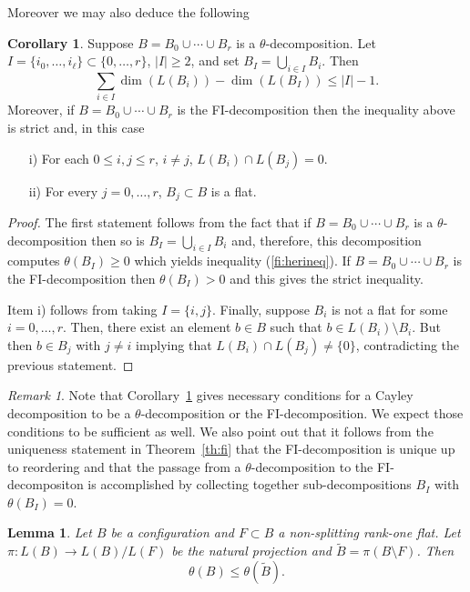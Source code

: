 \documentclass[11pt]{amsart}
\theoremstyle{plain}
\newtheorem{lemma}[theorem]{Lemma}
\theoremstyle{definition}
\newtheorem{corollary}[theorem]{Corollary}
\newcounter{remarks}
\theoremstyle{remark}
\newtheorem{remark}[remarks]{Remark}
\newcommand{\beq}{\begin{equation}}
\newcommand{\eeq}{\end{equation}}
\newcommand{\fs}{\mathfrak s}
\numberwithin{equation}{section}
\begin{document}
Moreover we may also deduce the following

\begin{corollary}\label{fi:cor3} 
Suppose $B = B_0 \cup \cdots \cup B_r$ is a $\theta$-decomposition.  Let 
$I = \{i_0,\dots,i_\ell\}  \subset \{0,\dots,r\}$, $|I| \geq 2$, and set
$B_I = \bigcup_{i\in I} B_i$.  Then
\beq\label{fi:herineq}
\sum_{i\in I} \dim(L(B_i)) - \dim(L(B_I)) \leq |I| - 1.
\eeq
Moreover, if $B = B_0 \cup \cdots \cup B_r$ is the FI-decomposition then the inequality above is strict and, in this case
\begin{enumerate}
\item[i)] For each $0\leq i,j \leq r$, $i\not= j$, $L(B_i) \cap L(B_j)=0$.
\item[ii)] For every $j=0,\dots,r$, $B_j \subset B$ is a flat.
\end{enumerate}
\end{corollary}

\begin{proof} 
The first statement follows from the fact that if $B = B_0 \cup \cdots \cup B_r$ is a $\theta$-decomposition then so is $B_I = \bigcup_{i\in I} B_i$ and, therefore, 
this decomposition computes $\theta(B_I) \geq 0$ which yields inequality (\ref{fi:herineq}).  If $B = B_0 \cup \cdots \cup B_r$ 
is the FI-decomposition then $\theta(B_I) > 0$ and this gives the strict inequality.

Item i) follows from taking $I = \{i,j\}$.  Finally, suppose $B_i$ is not a flat for some $i=0, \dots, r$.  Then, there exist an element $b \in B$ such that 
$b \in  L(B_i) \setminus B_i$. 
But then $b \in B_j$ with $j\not=i$ implying that
$ L(B_i) \cap L(B_j) \not=\{0\}$,
contradicting the previous statement.
\end{proof}

\begin{remark}\label{rem:4}
Note that  Corollary~\ref{fi:cor3}
 gives necessary conditions for a Cayley decomposition to be a $\theta$-decomposition or the FI-decomposition.  
 We expect those conditions 
to be sufficient as well.  We also point out that it follows from the uniqueness statement in Theorem~\ref{th:fi} that the FI-decomposition is unique up to reordering and that the passage from a $\theta$-decomposition to the FI-decompositon is accomplished by collecting together sub-decompositions $B_I$ with $\theta(B_I)=0$. \end{remark}

\begin{lemma}\label{ito:lemma_quotient}
Let $B$ be a configuration and $F \subset B$ a non-splitting rank-one flat.  %
 Let $\pi \colon  L(B) \to L(B) /L(F) $
be the natural projection and $\tilde B = \pi(B\setminus F)$.  Then 
$$\theta(B) \leq \theta(\tilde B).$$
\end{lemma}
\end{document}
